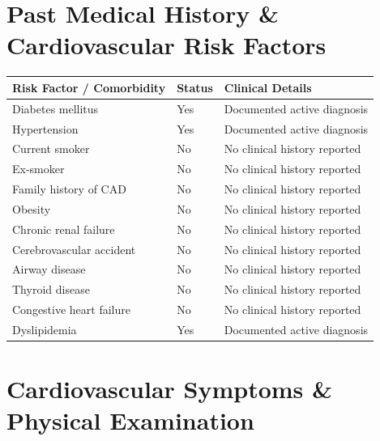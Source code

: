 \documentclass[10pt,a4paper]{article}
\begin{document}
\vspace{8pt}

\section*{Past Medical History \& Cardiovascular Risk Factors}

\begin{tabular}{@{} p{6.8cm} p{2.8cm} p{5.5cm} @{}}
  \toprule
  \textbf{Risk Factor / Comorbidity} & \textbf{Status} & \textbf{Clinical Details} \\
  \midrule
  Diabetes mellitus & Yes & Documented active diagnosis \\
  Hypertension & Yes & Documented active diagnosis \\
  Current smoker & No & No clinical history reported \\
  Ex-smoker & No & No clinical history reported \\
  Family history of CAD & No & No clinical history reported \\
  Obesity & No & No clinical history reported \\
  Chronic renal failure & No & No clinical history reported \\
  Cerebrovascular accident & No & No clinical history reported \\
  Airway disease & No & No clinical history reported \\
  Thyroid disease & No & No clinical history reported \\
  Congestive heart failure & No & No clinical history reported \\
  Dyslipidemia & Yes & Documented active diagnosis \\
  \bottomrule
\end{tabular}

\vspace{8pt}

\section*{Cardiovascular Symptoms \& Physical Examination}
\end{document}
